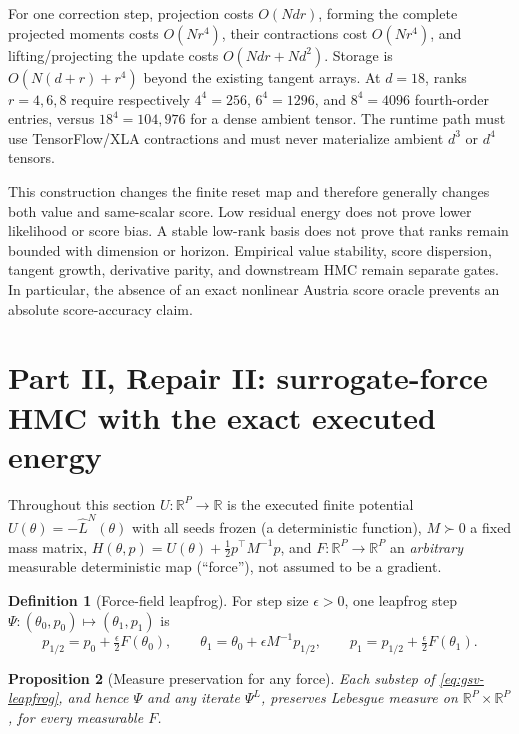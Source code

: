 \documentclass[11pt]{article}
\newtheorem{proposition}{Proposition}[section]
\theoremstyle{definition}
\newtheorem{definition}[proposition]{Definition}
\theoremstyle{remark}
\begin{document}
For one correction step, projection costs $O(Ndr)$, forming the complete
projected moments costs $O(Nr^4)$, their contractions cost $O(Nr^4)$, and
lifting/projecting the update costs $O(Ndr+Nd^2)$.  Storage is
$O(N(d+r)+r^4)$ beyond the existing tangent arrays.  At $d=18$, ranks
$r=4,6,8$ require respectively $4^4=256$, $6^4=1296$, and $8^4=4096$
fourth-order entries, versus $18^4=104{,}976$ for a dense ambient tensor.
The runtime path must use TensorFlow/XLA contractions and must never
materialize ambient $d^3$ or $d^4$ tensors.

This construction changes the finite reset map and therefore generally
changes both value and same-scalar score.  Low residual energy does not prove
lower likelihood or score bias.  A stable low-rank basis does not prove that
ranks remain bounded with dimension or horizon.  Empirical value stability,
score dispersion, tangent growth, derivative parity, and downstream HMC
remain separate gates.  In particular, the absence of an exact nonlinear
Austria score oracle prevents an absolute score-accuracy claim.

\section{Part II, Repair II: surrogate-force HMC with the exact executed energy}
\label{sec:gsv-hmc}

Throughout this section $U:\mathbb{R}^{P}\to\mathbb{R}$ is the executed
finite potential $U(\theta)=-\widehat L^{N}(\theta)$ with all seeds frozen
(a deterministic function), $M\succ0$ a fixed mass matrix,
$H(\theta,p)=U(\theta)+\tfrac12p^{\top}M^{-1}p$, and
$F:\mathbb{R}^{P}\to\mathbb{R}^{P}$ an \emph{arbitrary} measurable
deterministic map (``force''), not assumed to be a gradient.

\begin{definition}[Force-field leapfrog]
\label{def:gsv-leapfrog}
For step size $\epsilon>0$, one leapfrog step
$\Psi:(\theta_0,p_0)\mapsto(\theta_1,p_1)$ is
\begin{equation}
\label{eq:gsv-leapfrog}
 p_{1/2}=p_0+\tfrac{\epsilon}{2}F(\theta_0),
 \qquad
 \theta_1=\theta_0+\epsilon M^{-1}p_{1/2},
 \qquad
 p_1=p_{1/2}+\tfrac{\epsilon}{2}F(\theta_1).
\end{equation}
\end{definition}

\begin{proposition}[Measure preservation for any force]
\label{prop:gsv-leapfrog-volume}
Each substep of \eqref{eq:gsv-leapfrog}, and hence $\Psi$ and any iterate
$\Psi^{L}$, preserves Lebesgue measure on
$\mathbb{R}^{P}\times\mathbb{R}^{P}$, for every measurable $F$.
\end{proposition}
\end{document}

